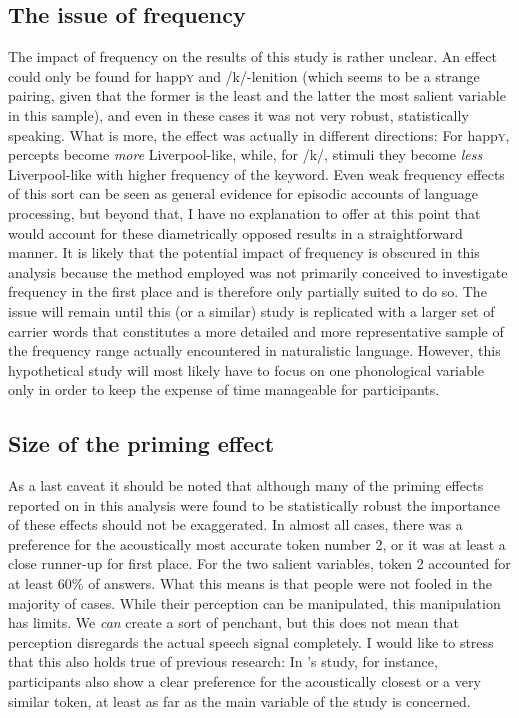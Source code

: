 		\subsection{The issue of frequency}

The impact of frequency on the results of this study is rather unclear.
An effect could only be found for happ\textsc{y} and /k/-lenition (which seems to be a strange pairing, given that the former is the least and the latter the most salient variable in this sample), and even in these cases it was not very robust, statistically speaking.
What is more, the effect was actually in different directions: For happ\textsc{y}, percepts become \emph{more} Liverpool-like, while, for /k/, stimuli they become \emph{less} Liverpool-like with higher frequency of the keyword.
Even weak frequency effects of this sort can be seen as general evidence for episodic accounts of language processing, but beyond that, I have no explanation to offer at this point that would account for these diametrically opposed results in a straightforward manner.
It is likely that the potential impact of frequency is obscured in this analysis because the method employed was not primarily conceived to investigate frequency in the first place and is therefore only partially suited to do so.
The issue will remain until this (or a similar) study is replicated with a larger set of carrier words that constitutes a more detailed and more representative sample of the frequency range actually encountered in naturalistic language.
However, this hypothetical study will most likely have to focus on one phonological variable only in order to keep the expense of time manageable for participants.

		\subsection{Size of the priming effect}

As a last caveat it should be noted that although many of the priming effects reported on in this analysis were found to be statistically robust the importance of these effects should not be exaggerated.
In almost all cases, there was a preference for the acoustically most accurate token number 2, or it was at least a close runner-up for first place.
For the two salient variables, token 2 accounted for at least 60\% of answers.
What this means is that people were not fooled in the majority of cases.
While their perception can be manipulated, this manipulation has limits.
We \emph{can} create a sort of penchant, but this does not mean that perception disregards the actual speech signal completely.
I would like to stress that this also holds true of previous research: In \textcite{haydrager2010}'s study, for instance, participants also show a clear preference for the acoustically closest or a very similar token, at least as far as the main variable of the study is concerned.

